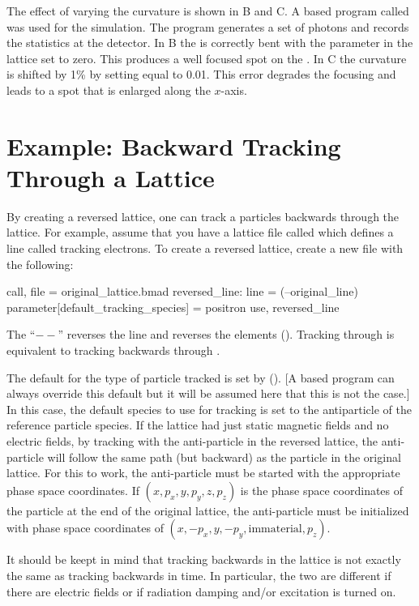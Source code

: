 The effect of varying the  curvature is shown in B and
C. A \bmad based program called  was used for the simulation. The 
program generates a set of photons and records the statistics at the detector. In B
the  is correctly bent with the parameter  in the lattice set to zero. This
produces a well focused spot on the . In C the  curvature
is shifted by 1\% by setting  equal to 0.01. This error degrades the focusing and leads to a
spot that is enlarged along the $x$-axis.


\section{Example: Backward Tracking Through a Lattice}
\label{s:reverse}

By creating a reversed lattice, one can track a particles backwards through the lattice. For
example, assume that you have a lattice file called  which defines a line
called  tracking electrons. To create a reversed lattice, create a new file with
the following:
\begin{example}
  call, file = original_lattice.bmad
  reversed_line: line = (--original_line)
  parameter[default_tracking_species] = positron
  use, reversed_line
\end{example}
The ``$--$'' reverses the line and reverses the elements (). Tracking
through  is equivalent to tracking backwards through .

The default for the type of particle tracked is set by 
(). [A \bmad based program can always override this default but it will be assumed
here that this is not the case.] In this case, the default species to use for tracking is set to the
antiparticle of the reference particle species. If the  lattice had just static
magnetic fields and no electric fields, by tracking with the anti-particle in the reversed lattice,
the anti-particle will follow the same path (but backward) as the particle in the original
lattice. For this to work, the anti-particle must be started with the appropriate phase space
coordinates. If $(x, p_x, y, p_y, z, p_z)$ is the phase space coordinates of the particle at the end
of the original lattice, the anti-particle must be initialized with phase space coordinates of $(x,
-p_x, y, -p_y, \text{immaterial}, p_z)$.

It should be keept in mind that tracking backwards in the lattice is not exactly the same as
tracking backwards in time. In particular, the two are different if there are electric fields or if
radiation damping and/or excitation is turned on.
